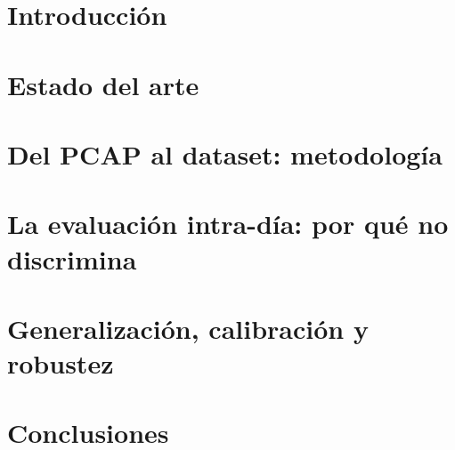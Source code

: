 \documentclass[a4paper, 11pt, oneside]{memoir}
\let\listofalgorithms\relax
\begin{document}
\cleardoublepage
 
 
\openany
{}
\begin{KeepFromToc}
  \tableofcontents
\end{KeepFromToc}
\clearpage
\listoffigures
\clearpage
\listoftables
\clearpage
\listofalgorithms
\openany
 
 
\cleardoublepage
\mainmatter
\pagestyle{ruled}
 
\chapter{Introducción} \label{ch:introduccion}

\cleardoublepage

\chapter{Estado del arte} \label{ch:estado-del-arte}

\cleardoublepage

\chapter{Del PCAP al dataset: metodología} \label{ch:metodologia}

\cleardoublepage

\chapter[La evaluación intra-día]{La evaluación intra-día: por qué no discrimina} \label{ch:regimenes}

\cleardoublepage

\chapter{Generalización, calibración y robustez} \label{ch:generalizacion}

\cleardoublepage

\chapter{Conclusiones} \label{ch:conclusiones}

\cleardoublepage
 
\end{document}
